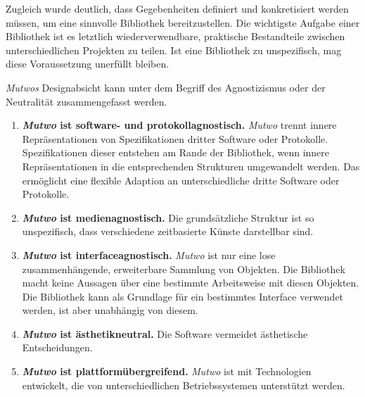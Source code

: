 \documentclass[12pt,a4paper,ngerman]{article}
\begin{document}
\smallskip

Zugleich wurde deutlich, dass Gegebenheiten definiert und konkretisiert werden müssen, um eine sinnvolle Bibliothek bereitzustellen.
Die wichtigste Aufgabe einer Bibliothek ist es letztlich wiederverwendbare, praktische Bestandteile zwischen unterschiedlichen Projekten zu teilen.
Ist eine Bibliothek zu unspezifisch, mag diese Voraussetzung unerfüllt bleiben.

\bigskip

\emph{Mutwos} Designabsicht kann unter dem Begriff des Agnostizismus oder der Neutralität zusammengefasst werden.

\begin{enumerate}

    \item{
            \textbf{ \emph{Mutwo} ist software- und protokollagnostisch. }
            \emph{Mutwo} trennt innere Repräsentationen von Spezifikationen dritter Software oder Protokolle.
            Spezifikationen dieser entstehen am Rande der Bibliothek, wenn innere Repräsentationen in die entsprechenden Strukturen umgewandelt werden.
            Das ermöglicht eine flexible Adaption an unterschiedliche dritte Software oder Protokolle.
    }

    \item{
            \textbf{ \emph{Mutwo} ist medienagnostisch. }
            Die grundsätzliche Struktur ist so unspezifisch, dass verschiedene zeitbasierte Künste darstellbar sind.
    }

    \item{
            \textbf{ \emph{Mutwo} ist interfaceagnostisch. }
            \emph{Mutwo} ist nur eine lose zusammenhängende, erweiterbare Sammlung von Objekten.
            Die Bibliothek macht keine Aussagen über eine bestimmte Arbeitsweise mit diesen Objekten.
            Die Bibliothek kann als Grundlage für ein bestimmtes Interface verwendet werden, ist aber unabhängig von diesem.
    }

    \item{
            \textbf{ \emph{Mutwo} ist ästhetikneutral. }
            Die Software vermeidet ästhetische Entscheidungen.
    }

    \item{
            \textbf{ \emph{Mutwo} ist plattformübergreifend. }
            \emph{Mutwo} ist mit Technologien entwickelt, die von unterschiedlichen Betriebssystemen unterstützt werden.
    }


\end{enumerate}
\end{document}
